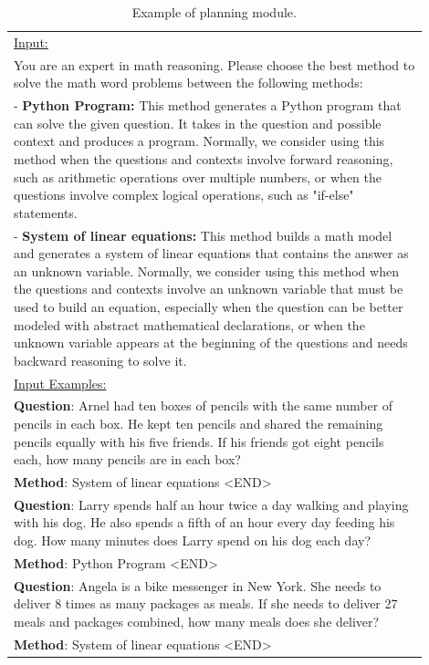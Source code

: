 \documentclass[10pt]{article} %
\begin{document}
\begin{table}[t]
  \caption{Example of planning module.}
  \label{tab:planning-module}
  \begin{center}
  \begin{tabular}{|p{0.9\linewidth}|}
  \hline
  \underline{Input:}\\
  You are an expert in math reasoning. Please choose the best method to solve the math word problems between the following methods: \\
  - \textbf{Python Program:} This method generates a Python program that can solve the given question. It takes in the question and possible context and produces a program. Normally, we consider using this method when the questions and contexts involve forward reasoning, such as arithmetic operations over multiple numbers, or when the questions involve complex logical operations, such as "if-else" statements. \\
  - \textbf{System of linear equations:} This method builds a math model and generates a system of linear equations that contains the answer as an unknown variable. Normally, we consider using this method when the questions and contexts involve an unknown variable that must be used to build an equation, especially when the question can be better modeled with abstract mathematical declarations, or when the unknown variable appears at the beginning of the questions and needs backward reasoning to solve it. \\
  \hline
  \underline{Input Examples:} \\
  \textbf{Question}: Arnel had ten boxes of pencils with the same number of pencils in each box. He kept ten pencils and shared the remaining pencils equally with his five friends. If his friends got eight pencils each, how many pencils are in each box? \\
  \textbf{Method}: System of linear equations <END> \\
  \textbf{Question}: Larry spends half an hour twice a day walking and playing with his dog. He also spends a fifth of an hour every day feeding his dog. How many minutes does Larry spend on his dog each day? \\
  \textbf{Method}: Python Program <END> \\
  \textbf{Question}: Angela is a bike messenger in New York. She needs to deliver 8 times as many packages as meals. If she needs to deliver 27 meals and packages combined, how many meals does she deliver? \\
  \textbf{Method}: System of linear equations <END>  \\

\end{tabular}
\end{center}
\end{table}
\end{document}
